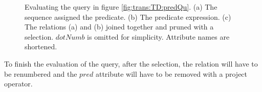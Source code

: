 \begin{myExample}
\begin{figure}[h]
\centering
{}
\quad
{}
\quad
{}
\caption[Evaluating the query in Figure \ref{fig:trans:TD:predQu}]{Evaluating the query in figure
\ref{fig:trans:TD:predQu}. (a) The sequence assigned the predicate. (b) The predicate expression. (c) The
relations (a) and (b) joined together and pruned with a selection. $dotNumb$ is omitted for simplicity. Attribute
names are shortened.}
\end{figure}

To finish the evaluation of the query, after the selection, the relation will have to be renumbered and the $pred$
attribute will have to be removed with a \textsf{project} operator.

\end{myExample}